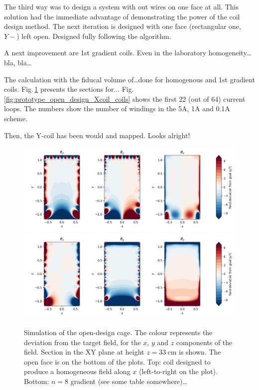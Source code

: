 The third way was to design a system with out wires on one face at all. This solution had the immediate advantage of demonstrating the power of the coil design method. The next iteration is designed with one face (rectangular one, $Y-$) left open. Designed fully following the algorithm.

A next improvement are 1st gradient coils. Even in the laboratory homogeneity\ldots bla, bla\ldots

The calculation with the fiducal volume of\ldots done for homogenous and 1st gradient coils. Fig.\,\ref{fig:prototype_open_design_simulation} presents the sections for... Fig.\,\ref{fig:prototype_open_design_Xcoil_coils} shows the first 22 (out of 64) current loops.  The numbers show the number of windings in the 5A, 1A and 0.1A scheme.

Then, the Y-coil has been would and mapped. Looks alright!

\begin{figure}
  \centering
  \includegraphics[width=\linewidth]{gfx/prototype/open_design_Xcoil_field_XY_z0_33.png}
  \includegraphics[width=\linewidth]{gfx/prototype/open_design_n8coil_field_XY_z0_33.png}
  \caption{Simulation of the open-design cage. The colour represents the deviation from the target field, for the $x$, $y$ and $z$ components of the field. Section in the XY plane at height $z=\SI{33}{\centi\meter}$ is shown. The open face is on the bottom of the plots. Top: coil designed to produce a homogeneous field along $x$ (left-to-right on the plot). Bottom: $n=8$ gradient (see some table somewhere)\ldots}
  \label{fig:prototype_open_design_simulation}
\end{figure}

